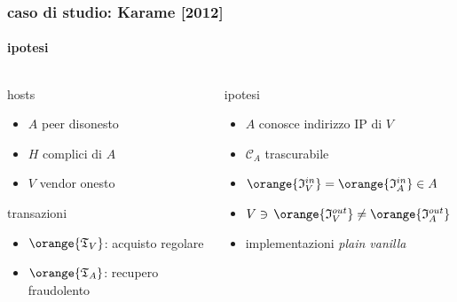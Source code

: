 \begin{frame}
	\frametitle{caso di studio: Karame [2012]}
	\framesubtitle{ipotesi}

	\begin{columns}
	 \begin{column}{.45\textwidth}
		hosts
		\begin{itemize}
		  \item $A$ peer disonesto
		  \item $H$ complici di $A$ 
		  \item $V$ vendor onesto
		\end{itemize}
		transazioni
		\begin{itemize}
		  \item $\orange{\mathfrak{T}_V}$: acquisto regolare
		  \item $\orange{\mathfrak{T}_A}$: recupero fraudolento
		\end{itemize}
	\end{column}
	
	\begin{column}{.65\textwidth}
		ipotesi
		\begin{itemize}
		  \item $A$ conosce indirizzo IP di $V$
		  \item $\mathcal{C}_A$ trascurabile
		  \item $\orange{\mathfrak{I}_V^{in}} = \orange{\mathfrak{I}_A^{in}} \in A$ 
		  \item $ V \ni\, \orange{\mathfrak{I}_V^{out}} \neq \orange{\mathfrak{I}_A^{out}} \in A$
		  \item implementazioni \textit{plain vanilla}
	 	\end{itemize}
 	\end{column}
 	\end{columns}

\end{frame}
